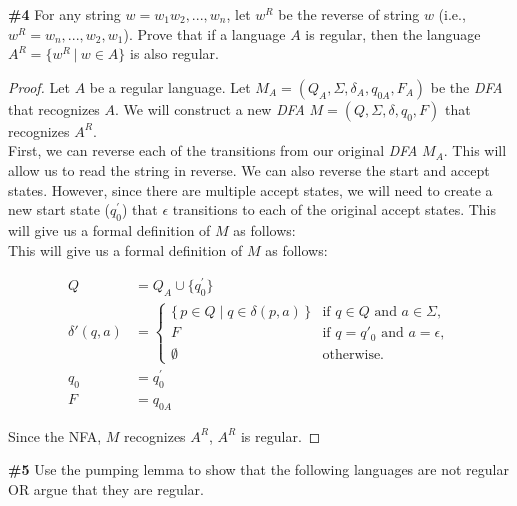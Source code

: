 \documentclass{article}
\newcommand{\problem}[1]{\textbf{\##1}}
\newcommand{\union}{\cup}
\begin{document}
\pagebreak

\problem{4} For any string $w = w_1w_2,...,w_n$, let $w^R$ be the reverse of string $w$ (i.e., $w^R=w_n,...,w_2,w_1$). Prove that if a language $A$ is regular, then the language $A^R = \{w^R \ | \ w \in A\}$ is also regular.

\begin{proof}
    Let $A$ be a regular language. Let $M_A = (Q_A, \Sigma, \delta_A, q_{0A}, F_A)$ be the \emph{DFA} that recognizes $A$. We will construct a new \emph{DFA} $M = (Q, \Sigma, \delta, q_0, F)$ that recognizes $A^R$.\\

    First, we can reverse each of the transitions from our original \emph{DFA} $M_A$. This will allow us to read the string in reverse. We can also reverse the start and accept states. However, since there are multiple accept states, we will need to create a new start state ($q^{'}_{0}$) that $\epsilon$ transitions to each of the original accept states. This will give us a formal definition of $M$ as follows:\\

    This will give us a formal definition of $M$ as follows:

    \begin{align*}
        Q &= Q_A \union \{q_0^{'}\}\\
        \delta'(q,a) &= 
        \begin{cases}
        \{\, p \in Q \mid q \in \delta(p,a) \,\} & \text{if } q \in Q \text{ and } a \in \Sigma, \\
        F & \text{if } q = q'_0 \text{ and } a = \epsilon, \\
        \emptyset & \text{otherwise.}
        \end{cases}\\
        q_0 &= q_0^{'}\\
        F &= q_{0A}
    \end{align*}

    Since the NFA, $M$ recognizes $A^R$, $A^R$ is regular.

\end{proof}

\pagebreak

\problem{5} Use the pumping lemma to show that the following languages are not regular OR argue that they are regular. 
\end{document}
